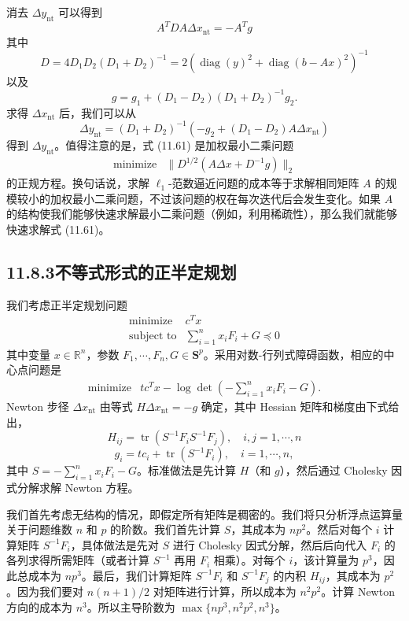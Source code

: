 \documentclass[UTF8, 12pt, fontset=fandol, oneside]{ctexart}
\begin{document}
消去 $\Delta y_{\mathrm{nt}}$ 可以得到
\begin{equation}
A^TDA\Delta x_{\mathrm{nt}}=-A^Tg
\tag{11.61}
\end{equation}
其中
\[
D=4D_1D_2(D_1+D_2)^{-1}
=2\left(\operatorname{diag}(y)^2+\operatorname{diag}(b-Ax)^2\right)^{-1}
\]
以及
\[
g=g_1+(D_1-D_2)(D_1+D_2)^{-1}g_2.
\]
求得 $\Delta x_{\mathrm{nt}}$ 后，我们可以从
\[
\Delta y_{\mathrm{nt}}=(D_1+D_2)^{-1}(-g_2+(D_1-D_2)A\Delta x_{\mathrm{nt}})
\]
得到 $\Delta y_{\mathrm{nt}}$。值得注意的是，式 (11.61) 是加权最小二乘问题
\[
\begin{array}{ll}
\text{minimize} & \|D^{1/2}(A\Delta x+D^{-1}g)\|_2
\end{array}
\]
的正规方程。换句话说，求解 $\ell_1$-范数逼近问题的成本等于求解相同矩阵 $A$ 的规模较小的加权最小二乘问题，不过该问题的权在每次迭代后会发生变化。如果 $A$ 的结构使我们能够快速求解最小二乘问题（例如，利用稀疏性），那么我们就能够快速求解式 (11.61)。

\subsection*{11.8.3\quad 不等式形式的正半定规划}

我们考虑正半定规划问题
\[
\begin{array}{ll}
\text{minimize} & c^Tx\\
\text{subject to} & \displaystyle\sum_{i=1}^n x_iF_i+G\preceq 0
\end{array}
\]
其中变量 $x\in\mathbb{R}^n$，参数 $F_1,\cdots,F_n,G\in\mathbf{S}^p$。采用对数-行列式障碍函数，相应的中心点问题是
\[
\begin{array}{ll}
\text{minimize} & tc^Tx-\log\det\left(-\displaystyle\sum_{i=1}^n x_iF_i-G\right).
\end{array}
\]
Newton 步径 $\Delta x_{\mathrm{nt}}$ 由等式 $H\Delta x_{\mathrm{nt}}=-g$ 确定，其中 Hessian 矩阵和梯度由下式给出，
\[
H_{ij}=\operatorname{tr}(S^{-1}F_iS^{-1}F_j),\quad i,j=1,\cdots,n
\]
\[
g_i=tc_i+\operatorname{tr}(S^{-1}F_i),\quad i=1,\cdots,n,
\]
其中 $S=-\sum_{i=1}^n x_iF_i-G$。标准做法是先计算 $H$（和 $g$），然后通过 Cholesky 因式分解求解 Newton 方程。

我们首先考虑无结构的情况，即假定所有矩阵是稠密的。我们将只分析浮点运算量关于问题维数 $n$ 和 $p$ 的阶数。我们首先计算 $S$，其成本为 $np^2$。然后对每个 $i$ 计算矩阵 $S^{-1}F_i$，具体做法是先对 $S$ 进行 Cholesky 因式分解，然后后向代入 $F_i$ 的各列求得所需矩阵（或者计算 $S^{-1}$ 再用 $F_i$ 相乘）。对每个 $i$，该计算量为 $p^3$，因此总成本为 $np^3$。最后，我们计算矩阵 $S^{-1}F_i$ 和 $S^{-1}F_j$ 的内积 $H_{ij}$，其成本为 $p^2$。因为我们要对 $n(n+1)/2$ 对矩阵进行计算，所以成本为 $n^2p^2$。计算 Newton 方向的成本为 $n^3$。所以主导阶数为 $\max\{np^3,n^2p^2,n^3\}$。
\end{document}
